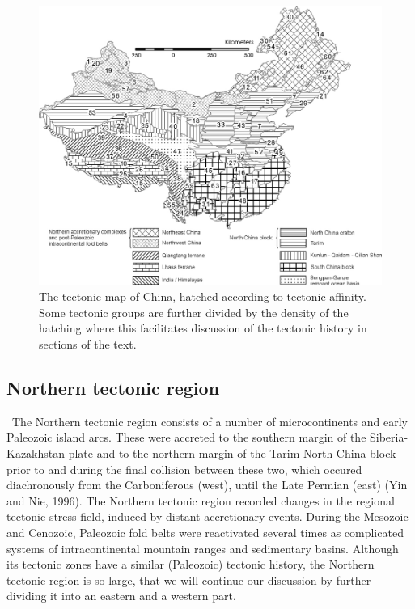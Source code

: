 \documentclass{article}
\begin{document}
 \begin{figure}[htbp]
   \centering
   \includegraphics[width=1\textwidth]{chinazones2.jpg}
   \caption{The tectonic map of China, hatched according to 
 tectonic affinity.   Some tectonic groups are further  divided by the
 density  of the  hatching where  this facilitates  discussion  of the
 tectonic history in sections of the text.}
   \label{fig:chinazones2}
 \end{figure}

 \subsection*{Northern tectonic region} \label{sec:ntr}
 ~\indent  The  Northern  tectonic  region  consists  of  a  number  of
 microcontinents and early Paleozoic island arcs.  These were accreted
 to the  southern margin  of the Siberia-Kazakhstan  plate and  to the
 northern margin  of the Tarim-North  China block prior to  and during
 the final  collision between  these two, which  occured diachronously
 from the Carboniferous (west), until the Late Permian (east) (Yin and
 Nie,  1996).  The Northern  tectonic region  recorded changes  in the
 regional  tectonic  stress  field,  induced by  distant  accretionary
 events.  During the Mesozoic  and Cenozoic, Paleozoic fold belts were
 reactivated several times  as complicated systems of intracontinental
 mountain ranges and sedimentary  basins.  Although its tectonic zones
 have a  similar (Paleozoic)  tectonic history, the  Northern tectonic
 region is so  large, that we will continue  our discussion by further
 dividing it into an eastern and a western part.
\end{document}
